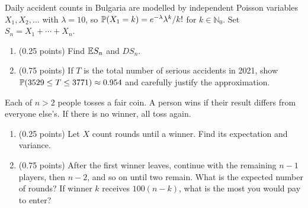 \documentclass[a4paper]{report}
\newif\ifshowsolutions
\begin{document}
\begin{problem}
Daily accident counts in Bulgaria are modelled by independent Poisson variables $X_1,X_2,\ldots$ with $\lambda=10$, so $\P(X_1=k)=e^{-\lambda}\lambda^k/k!$ for $k\in\mathbb N_0$. Set $S_n=X_1+\cdots+X_n$.
\begin{enumerate}
\item (0.25 points) Find $\E S_n$ and $DS_n$.
\ifshowsolutions\par\textbf{Solution.} $\E S_n=DS_n=n\lambda$, since the $X_i$ are independent and $\E X_i=DX_i=\lambda$.\fi
\item (0.75 points) If $T$ is the total number of serious accidents in 2021, show $\P(3529\leq T\leq3771)\approx0.954$ and carefully justify the approximation.
\ifshowsolutions\par\textbf{Solution.} Use the CLT, explicitly checking its hypotheses, in particular $\E[X_i^2]<\infty$.\fi
\end{enumerate}
\end{problem}
\begin{problem}
Each of $n>2$ people tosses a fair coin. A person wins if their result differs from everyone else's. If there is no winner, all toss again.
\begin{enumerate}
\item (0.25 points) Let $X$ count rounds until a winner. Find its expectation and variance.
\ifshowsolutions
\par\textbf{Solution.} A winner requires one head and all other tails, or the reverse. This has probability $p_n=n/2^{n-1}$ (why?). Hence $X\sim\mathrm{Ge}(p_n)$, $\E X=1/p_n$ and $DX=1/p_n^2$.
\fi
\item (0.75 points) After the first winner leaves, continue with the remaining $n-1$ players, then $n-2$, and so on until two remain. What is the expected number of rounds? If winner $k$ receives $100(n-k)$, what is the most you would pay to enter?
\ifshowsolutions
\par\textbf{Solution.} Explain why the expected number is $1/p_n+1/p_{n-1}+\cdots+1/p_3$. By symmetry all players have the same expected winnings, and the total paid is $100[(n-1)+(n-2)+\cdots+2]$, so divide this total by $n$.
\par Although not required, the total simplifies to $100[n(n-1)/2-1]$. The \href{https://math.stackexchange.com/questions/888354/asymptotic-behavior-of-sum-limits-k-1n-frac2kk}{asymptotic behaviour of the other sum} is nontrivial and equals $2^n/n$.
\fi
\end{enumerate}
\end{problem}
\end{document}
